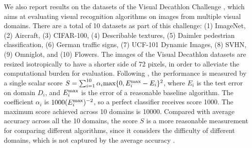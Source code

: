 \documentclass[10pt,twocolumn,letterpaper]{article}
\begin{document}
We also report results on the datasets of the Visual Decathlon Challenge \cite{rebuffi2017learning}, which aims at evaluating visual recognition algorithms on images from multiple visual domains. There are a total of 10 datasets as part of this challenge: (1) ImageNet, (2) Aircraft, (3) CIFAR-100, (4)  Describable textures, (5) Daimler pedestrian classification, (6) German traffic signs, (7) UCF-101 Dynamic Images, (8) SVHN, (9) Omniglot, and (10) Flowers. The images of the Visual Decathlon datasets are resized isotropically to have a shorter side of 72 pixels, in order to alleviate the computational burden for evaluation.  
Following \cite{rebuffi2017learning}, the performance is measured by a single scalar score $S = \sum_{i=1}^{10}\alpha_i \textnormal{max}\{0, E_i^{\textnormal{max}}-E_i\}^2$, 
where $E_i$ is the test error on domain $D_i$, and $E_i^{\textnormal{max}}$ is the error of a reasonable baseline algorithm. The coefficient $\alpha_{i}$ is  $1000(E_i^{\textnormal{max}})^{-2}$, so a perfect classifier receives score 1000. The maximum score achieved across 10 domains is 10000. Compared with average accuracy across all the 10 domains, the score $S$ is a more reasonable measurement for comparing different algorithms, since it considers the difficulty of different domains, which is not captured by the average accuracy \cite{rebuffi2017learning}.
\end{document}
